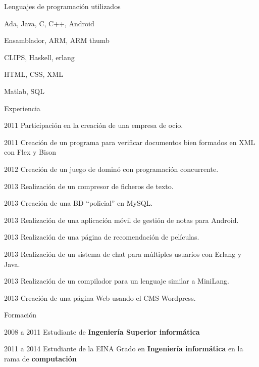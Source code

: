 \begin{cv}{}
\vspace{2em}

\begin{cvlist}{Lenguajes de programación utilizados}
\item Ada, Java, C, C++, Android
\item Ensamblador, ARM, ARM thumb
\item CLIPS, Haskell, erlang
\item HTML, CSS, XML
\item Matlab, SQL
\end{cvlist}

\begin{cvlist}{Experiencia}

	\item[2011] Participación en la creación de una empresa de ocio.
	\item[2011] Creación de un programa para verificar documentos bien formados en XML con Flex y Bison
	\item[2012] Creación de un juego de dominó con programación concurrente.
	\item[2013] Realización de un compresor de ficheros de texto.
	\item[2013] Creación de una BD ``policial'' en MySQL.
	\item[2013] Realización de una aplicación móvil de gestión de notas para Android.
	\item[2013] Realización de una página de recomendación de películas.
	\item[2013] Realización de un sistema de chat para múltiples usuarios con Erlang y Java.
	\item[2013] Realización de un compilador para un lenguaje similar a MiniLang.
	\item[2013] Creación de una página Web usando el CMS Wordpress.

\end{cvlist}

\begin{cvlist}{Formación}

	\item[2008 a 2011] Estudiante de \textbf{Ingeniería Superior informática}
	\item[2011 a 2014] Estudiante de la EINA
		Grado en \textbf{Ingeniería informática} en la rama de \textbf{computación}


\end{cvlist}

\end{cv}